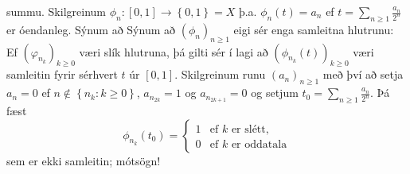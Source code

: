 \documentclass[a4paper,icelandic]{book}
\theoremstyle{definition}
\theoremstyle{plain}
\theoremstyle{remark}
\begin{document}
summu. Skilgreinum $\phi_n:\left[ 0,1 \right]\to\left\{ 0,1
\right\} = X$ þ.a. $\phi_n(t) = a_n$ ef $t = \sum_{n\geq 1}
\frac{a_n}{2^n}$ er óendanleg. Sýnum að Sýnum að $(\phi_n)_{n\geq 1}$
eigi sér enga samleitna hlutrunu: Ef $(\varphi_{n_k})_{k\geq 0}$ væri
slík hlutruna, þá gilti sér í lagi að $(\phi_{n_k}(t))_{k\geq 0}$ væri
samleitin fyrir sérhvert $t$ úr $\left[ 0,1 \right]$. Skilgreinum runu
$(a_n)_{n\geq 1}$ með því að setja $a_n=0$ ef $n\notin\left\{ n_k:k\geq
0 \right\}$, $a_{n_{2k}} = 1$ og $a_{n_{2k+1}}=0$ og setjum $t_0 =
\sum_{n\geq 1} \frac{a_n}{2^n}$. Þá fæst \[
\phi_{n_k}(t_0) =
\begin{cases}
  1 &\text{ef $k$ er slétt},\\
  0 &\text{ef $k$ er oddatala}
\end{cases}
\]
sem er ekki samleitin; mótsögn!
\end{document}
